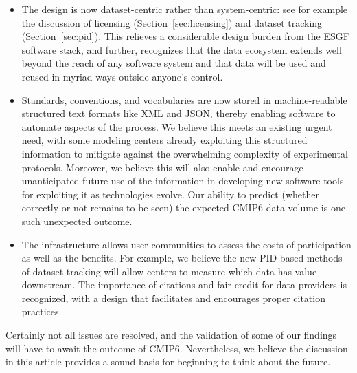 \documentclass[gmd,manuscript]{copernicus}
\begin{document}
\begin{itemize}
\item The design is now dataset-centric rather than system-centric:
  see for example the discussion of licensing
  (Section~\ref{sec:licensing}) and dataset tracking
  (Section~\ref{sec:pid}). This relieves a considerable design burden
  from the ESGF software stack, and further, recognizes that the data
  ecosystem extends well beyond the reach of any software system and
  that data will be used and reused in myriad ways outside anyone's
  control.
\item Standards, conventions, and vocabularies are now stored in
  machine-readable structured text formats like XML and JSON, thereby
  enabling software to automate aspects of the process. We believe
  this meets an existing urgent need, with some modeling centers
  already exploiting this structured information to mitigate against
  the overwhelming complexity of experimental protocols. Moreover, we
  believe this will also enable and encourage unanticipated future use
  of the information in developing new software tools for exploiting
  it as technologies evolve. Our ability to predict (whether correctly
  or not remains to be seen) the expected CMIP6 data volume is one
  such unexpected outcome.
\item The infrastructure allows user communities to assess the costs
  of participation as well as the benefits. For example, we believe
  the new PID-based methods of dataset tracking will allow centers to
  measure which data has value downstream. The importance of citations
  and fair credit for data providers is recognized, with a design that
  facilitates and encourages proper citation practices.
\end{itemize}

Certainly not all issues are resolved, and the validation of some of
our findings will have to await the outcome of CMIP6. Nevertheless, we
believe the discussion in this article provides a sound basis for
beginning to think about the future.
\end{document}
